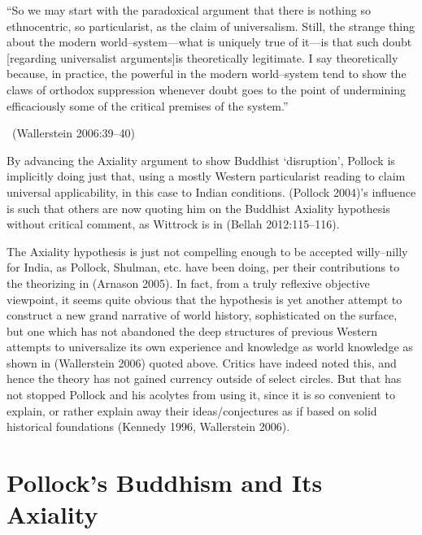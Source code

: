 \begin{myquote}
“So we may start with the paradoxical argument that there is nothing so ethnocentric, so particularist, as the claim of universalism. Still, the strange thing about the modern world–system—what is uniquely true of it—is that such doubt [regarding universalist arguments]is theoretically legitimate. I say theoretically because, in practice, the powerful in the modern world–system tend to show the claws of orthodox suppression whenever doubt goes to the point of undermining efficaciously some of the critical premises of the system.” 

~\hfill (Wallerstein 2006:39–40)
\end{myquote}

By advancing the Axiality argument to show Buddhist ‘disruption’, Pollock is implicitly doing just that, using a mostly Western particularist reading to claim universal applicability, in this case to Indian conditions. (Pollock 2004)’s influence is such that others are now quoting him on the Buddhist Axiality hypothesis without critical comment, as Wittrock is in (Bellah 2012:115–116).

The Axiality hypothesis is just not compelling enough to be accepted willy–nilly for India, as Pollock, Shulman, etc. have been doing, per their contributions to the theorizing in (Arnason 2005). In fact, from a truly reflexive objective viewpoint, it seems quite obvious that the hypothesis is yet another attempt to construct a new grand narrative of world history, sophisticated on the surface, but one which has not abandoned the deep structures of previous Western attempts to universalize its own experience and knowledge as world knowledge as shown in (Wallerstein 2006) quoted above. Critics have indeed noted this, and hence the theory has not gained currency outside of select circles. But that has not stopped Pollock and his acolytes from using it, since it is so convenient to explain, or rather explain away their ideas/conjectures as if based on solid historical foundations (Kennedy 1996, Wallerstein 2006).


\section*{Pollock’s Buddhism and Its Axiality}

